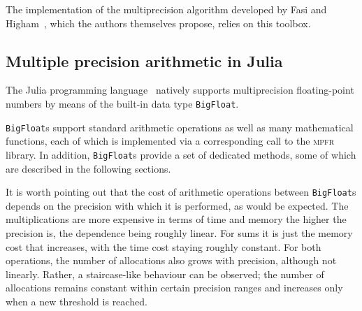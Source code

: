 The \matlab{} implementation of the multiprecision algorithm developed by Fasi and Higham~\cite{higham:hf19_mpexpm}, which the authors themselves propose, relies on this toolbox.

\subsection{Multiple precision arithmetic in Julia}\label{subs:multiprecision_in_Julia}
The Julia programming language~\cite{article:Julia} natively supports multiprecision floating-point numbers by means of the built-in data type \texttt{BigFloat}.

\texttt{BigFloat}s support standard arithmetic operations as well as many mathematical functions, each of which is implemented via a corresponding call to the \textsc{mpfr}~\cite{article:MPFR} library. In addition, \texttt{BigFloat}s provide a set of dedicated methods, some of which are described in the following sections.

\smallskip 


It is worth pointing out that the cost of arithmetic operations between \texttt{BigFloat}s depends on the precision with which it is performed, as would be expected. 
The multiplications are more expensive in terms of time and memory the higher the precision is, the dependence being roughly linear. For sums it is just the memory cost that increases, with the time cost staying roughly constant. For both operations, the number of allocations also grows with precision, although not linearly. Rather, a staircase-like behaviour can be observed; the number of allocations remains constant within certain precision ranges and increases only when a new threshold is reached.

